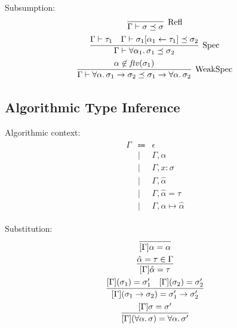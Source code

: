 Subsumption:
\begin{gather*}
  \infer[\text{Refl}]{
    \Gamma \vdash \sigma \preceq \sigma
  }{}
  \\
  \infer[\text{Spec}]{
    \Gamma \vdash \forall \alpha_1\ldotp \sigma_1 \preceq \sigma_2
  }{
    \Gamma \vdash \tau_1
    &
    \Gamma \vdash \sigma_1[\alpha_1 \assign \tau_1] \preceq \sigma_2
  }
  \\
  \infer[\text{WeakSpec}]{
    \Gamma \vdash \forall \alpha\ldotp \sigma_1 \to \sigma_2 \preceq \sigma_1 \to \forall \alpha\ldotp\sigma_2
  }{
    \alpha \not\in \mathit{ftv}(\sigma_1)
  }
\end{gather*}

\subsection{Algorithmic Type Inference}

Algorithmic context:
\begin{align*}
  \begin{array}{rcl}
    \Gamma &\Coloneq &\epsilon \\
    &\mid &\Gamma, \alpha \\
    &\mid &\Gamma, x: \sigma \\
    &\mid &\Gamma, \hat{\alpha} \\
    &\mid &\Gamma, \hat{\alpha} = \tau \\
    &\mid &\Gamma, \alpha \mapsto \hat{\alpha}
  \end{array}
\end{align*}

Substitution:
\begin{gather*}
  \infer{[\Gamma]\alpha = \alpha}{}
  \\
  \infer{[\Gamma]\hat{\alpha} = \tau}{
    \hat{\alpha} = \tau \in \Gamma
  }
  \\
  \infer{[\Gamma](\sigma_1 \to \sigma_2) = \sigma_1' \to \sigma_2'}{
    [\Gamma](\sigma_1) = \sigma_1'
    &
    [\Gamma](\sigma_2) = \sigma_2'
  }
  \\
  \infer{[\Gamma](\forall \alpha\ldotp \sigma) = \forall \alpha\ldotp \sigma'}{
    [\Gamma]\sigma = \sigma'
  }
\end{gather*}

